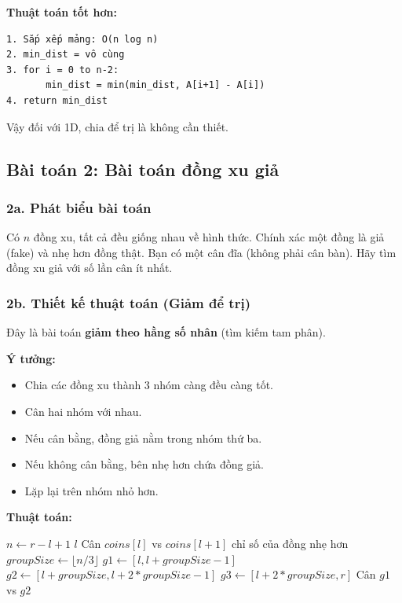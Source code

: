 \documentclass{article}
\begin{document}
\textbf{Thuật toán tốt hơn:}
\begin{verbatim}
1. Sắp xếp mảng: O(n log n)
2. min_dist = vô cùng
3. for i = 0 to n-2:
       min_dist = min(min_dist, A[i+1] - A[i])
4. return min_dist
\end{verbatim}

Vậy đối với 1D, chia để trị là không cần thiết.

\subsection{Bài toán 2: Bài toán đồng xu giả}

\subsubsection{2a. Phát biểu bài toán}

Có \(n\) đồng xu, tất cả đều giống nhau về hình thức. Chính xác một đồng là giả (fake) và nhẹ hơn đồng thật. Bạn có một cân đĩa (không phải cân bàn). Hãy tìm đồng xu giả với số lần cân ít nhất.

\subsubsection{2b. Thiết kế thuật toán (Giảm để trị)}

Đây là bài toán \textbf{giảm theo hằng số nhân} (tìm kiếm tam phân).

\textbf{Ý tưởng:}
\begin{itemize}
    \item Chia các đồng xu thành 3 nhóm càng đều càng tốt.
    \item Cân hai nhóm với nhau.
    \item Nếu cân bằng, đồng giả nằm trong nhóm thứ ba.
    \item Nếu không cân bằng, bên nhẹ hơn chứa đồng giả.
    \item Lặp lại trên nhóm nhỏ hơn.
\end{itemize}

\textbf{Thuật toán:}

\begin{algorithmic}[1]
    \State $n \gets r - l + 1$
        \State \Return $l$
        \State Cân $coins[l]$ vs $coins[l+1]$
        \State \Return chỉ số của đồng nhẹ hơn
    \Else
        \State $groupSize \gets \lfloor n/3 \rfloor$
        \State $g1 \gets [l, l+groupSize-1]$
        \State $g2 \gets [l+groupSize, l+2*groupSize-1]$
        \State $g3 \gets [l+2*groupSize, r]$
        \State Cân $g1$ vs $g2$
            \State \Return {}
            \State \Return {}
        \Else
            \State \Return {}
        \EndIf
    \EndIf
\EndFunction
\end{algorithmic}
\end{document}
